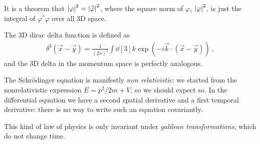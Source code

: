 \documentclass[main.tex]{subfiles}
\begin{document}
It is a theorem that \(\abs{\varphi }^2 = \abs{\widetilde{\varphi}}^2\), where the square norm of \(\varphi \), \(\abs{\varphi}^2\), is just the integral of \(\varphi^{*} \varphi \) over all 3D space. 

The 3D dirac delta function is defined as 
%
\begin{align}
\delta^{3 } (\vec{x} - \vec{y}) = \frac{1}{(2\pi )^3}
\int \dd[3]{k} \exp(- i \vec{k} \cdot (\vec{x} - \vec{y}))
\,,
\end{align}
%
and the 3D delta in the momentum space is perfectly analogous. 

The Schrödinger equation is manifestly \emph{non relativistic}: we started from the nonrelativistic expression \(E = p^2/2m + V\), so we should expect so. 
In the differential equation we have a second spatial derivative and a first temporal derivative: there is no way to write such an equation  covariantly. 

This kind of law of physics is only invariant under \emph{galilean transformations}, which do not change time. 
\end{document}
